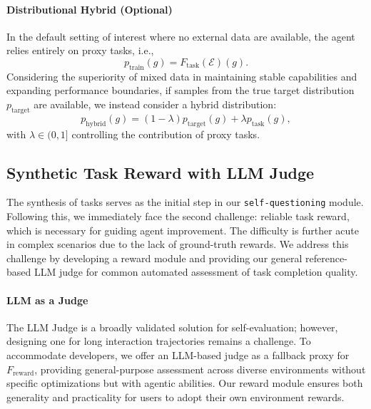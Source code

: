 \paragraph{Distributional Hybrid (Optional)}
In the default setting of interest where no external data are available, the agent relies entirely on proxy tasks, i.e.,
\begin{equation}
    p_{\mathrm{train}}(g) = F_{\mathrm{task}}(\mathcal{E})(g).
\end{equation}
Considering the superiority of mixed data in maintaining stable capabilities and expanding performance boundaries, if samples from the true target distribution $p_{\mathrm{target}}$ are available, we instead consider a hybrid distribution:
\begin{equation}
    p_{\mathrm{hybrid}}(g) = (1-\lambda) p_{\mathrm{target}}(g) + \lambda p_{\mathrm{task}}(g),
\end{equation}
with $\lambda \in (0,1]$ controlling the contribution of proxy tasks.  



\subsection{Synthetic Task Reward with LLM Judge}\label{sec:self-questioning-llm-judge}

The synthesis of tasks serves as the initial step in our \texttt{self-questioning} module. Following this, we immediately face the second challenge: reliable task reward, which is necessary for guiding agent improvement. The difficulty is further acute in complex scenarios due to the lack of ground-truth rewards.
We address this challenge by developing a reward module and providing our general reference-based LLM judge for common automated assessment of task completion quality.


\paragraph{LLM as a Judge} The LLM Judge is a broadly validated solution for self-evaluation; however, designing one for long interaction trajectories remains a challenge. To accommodate developers, we offer an LLM-based judge as a fallback proxy for $F_{\mathrm{reward}}$, providing general-purpose assessment across diverse environments without specific optimizations but with agentic abilities. Our reward module ensures both generality and practicality for users to adopt their own environment rewards.


